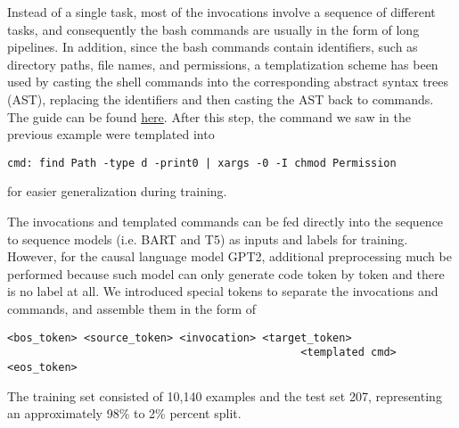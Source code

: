 \documentclass{article}
\begin{document}
Instead of a single task, most of the invocations involve a sequence of
different tasks, and consequently the bash commands are usually in the form of
long pipelines. In addition, since the bash commands contain identifiers, such
as directory paths, file names, and permissions, a templatization scheme has
been used by casting the shell commands into the corresponding abstract syntax
trees (AST), replacing the identifiers and then casting the AST back to
commands. The guide can be found
\href{https://github.com/IBM/clai/tree/nlc2cmd}{here}. After this step, the
command we saw in the previous example were templated into
\begin{verbatim}
cmd: find Path -type d -print0 | xargs -0 -I chmod Permission
\end{verbatim}
for easier generalization during training.

The invocations and templated commands can be fed directly into the sequence
to sequence models (i.e. BART and T5) as inputs and labels for training.
However, for the causal language model GPT2, additional preprocessing much be
performed because such model can only generate code token by token and there is
no label at all. We introduced special tokens to separate the invocations and
commands, and assemble them in the form of

\begin{verbatim}
<bos_token> <source_token> <invocation> <target_token>
                                              <templated cmd> <eos_token> 
\end{verbatim}

The training set consisted of 10,140 examples and the test set 207,
representing an approximately 98\% to 2\% percent split.
\end{document}
